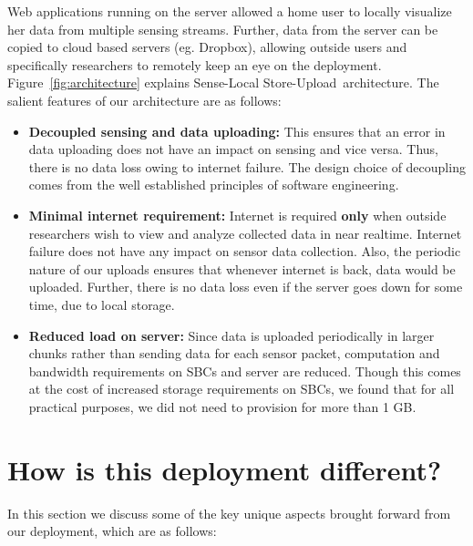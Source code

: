 \documentclass[10pt]{sensys-proc}
\newcommand{\figref}[1]{Figure~\ref{#1}}
\newcommand{\paradigms}{Sense-Local Store-Upload~}
\begin{document}
Web applications running on the server allowed a home user to locally visualize her data from multiple sensing streams. Further, data from the server can be copied to cloud based servers (eg. Dropbox), allowing outside users and specifically researchers to remotely keep an eye on the deployment. \figref{fig:architecture} explains \paradigms architecture. The salient features of our architecture are as follows:
\begin{itemize}
\item \textbf{Decoupled sensing and data uploading:} This ensures that an error in data uploading does not have an impact on sensing and vice versa. Thus, there is no data loss owing to internet failure. The design choice of decoupling comes from the well established principles of software engineering.
\item \textbf{Minimal internet requirement:} Internet is required \textbf{only} when outside researchers wish to view and analyze collected data in near realtime. Internet failure does not have any impact on sensor data collection. Also, the periodic nature of our uploads ensures that whenever internet is back, data would be uploaded. Further, there is no data loss even if the server goes down for some time, due to local storage.
\item \textbf{Reduced load on server:} Since data is uploaded periodically in larger chunks rather than sending data for each sensor packet, computation and bandwidth requirements on SBCs and server are reduced. Though this comes at the cost of increased storage requirements on SBCs, we found that for all practical purposes, we did not need to provision for more than 1 GB.
\end{itemize}



\section{How is this deployment different?}
\label{sec:learning}
In this section we discuss some of the key unique aspects brought forward from our deployment, which are as follows:
\end{document}
